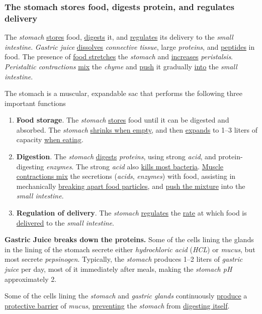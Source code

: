 \documentclass[11pt]{article}
\begin{document}
\subsubsection{The stomach stores food, digests protein, and regulates delivery}
\label{sec:orgf0915f4}
The \emph{stomach} \uline{stores} food, \uline{digests} it, and \uline{regulates} its delivery to the \emph{small
intestine}. \emph{Gastric juice} \uline{dissolves} \emph{connective tissue}, large \emph{proteins}, and
\uline{peptides} in food. The presence of \uline{food stretches} the \emph{stomach} and \uline{increases}
\emph{peristalsis}. \emph{Peristaltic contractions} \uline{mix} the \emph{chyme} and \uline{push} it gradually \uline{into}
the \emph{small intestine}.

The stomach is a muscular, expandable sac that performs the following three
important functions
\begin{enumerate}
\item \textbf{Food storage}. The \emph{stomach} \uline{stores} food until it can be digested and absorbed.
The \emph{stomach} \uline{shrinks when empty}, and then \uline{expands} to 1--3 liters of capacity
\uline{when eating}.
\item \textbf{Digestion}. The \emph{stomach} \uline{digests} \emph{proteins}, using strong \emph{acid}, and
protein-digesting \emph{enzymes}. The strong \emph{acid} also \uline{kills most bacteria}. \uline{Muscle
contractions mix} the secretions (\emph{acids}, \emph{enzymes}) with food, assisting in
mechanically \uline{breaking apart food particles}, and \uline{push the mixture} into the
\emph{small intestine}.
\item \textbf{Regulation of delivery}. The \emph{stomach} \uline{regulates} the \uline{rate} at which food is
\uline{delivered} to the \emph{small intestine}.
\end{enumerate}


\textbf{Gastric Juice breaks down the proteins.} Some of the cells lining the glands in
the lining of the stomach secrete either \emph{hydrochloric acid} (\emph{HCL}) or \emph{mucus}, but
most secrete \emph{pepsinogen}. Typically, the \emph{stomach} produces 1--2 liters of \emph{gastric
juice} per day, most of it immediately after meals, making the \emph{stomach pH}
approximately 2.

Some of the cells lining the \emph{stomach} and \emph{gastric glands} continuously \uline{produce} a
\uline{protective barrier} of \emph{mucus}, \uline{preventing} the \emph{stomach} from \uline{digesting itself}.
\end{document}
